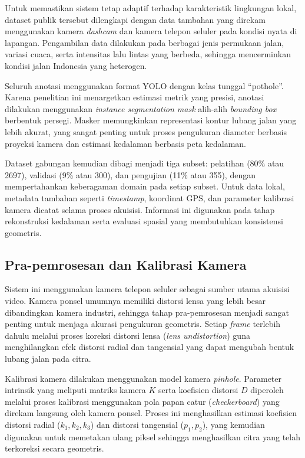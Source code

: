 Untuk memastikan sistem tetap adaptif terhadap karakteristik lingkungan lokal, dataset publik tersebut dilengkapi dengan data tambahan yang direkam menggunakan kamera \textit{dashcam} dan kamera telepon seluler pada kondisi nyata di lapangan. Pengambilan data dilakukan pada berbagai jenis permukaan jalan, variasi cuaca, serta intensitas lalu lintas yang berbeda, sehingga mencerminkan kondisi jalan Indonesia yang heterogen.

Seluruh anotasi menggunakan format YOLO dengan kelas tunggal “pothole”. Karena penelitian ini menargetkan estimasi metrik yang presisi, anotasi dilakukan menggunakan \textit{instance segmentation mask} alih-alih \textit{bounding box} berbentuk persegi. Masker memungkinkan representasi kontur lubang jalan yang lebih akurat, yang sangat penting untuk proses pengukuran diameter berbasis proyeksi kamera dan estimasi kedalaman berbasis peta kedalaman.

Dataset gabungan kemudian dibagi menjadi tiga subset: pelatihan (80\% atau 2697), validasi (9\% atau 300), dan pengujian (11\% atau 355), dengan mempertahankan keberagaman domain pada setiap subset. Untuk data lokal, metadata tambahan seperti \textit{timestamp}, koordinat GPS, dan parameter kalibrasi kamera dicatat selama proses akuisisi. Informasi ini digunakan pada tahap rekonstruksi kedalaman serta evaluasi spasial yang membutuhkan konsistensi geometris.

\subsection{Pra-pemrosesan dan Kalibrasi Kamera}
Sistem ini menggunakan kamera telepon seluler sebagai sumber utama akuisisi video. Kamera ponsel umumnya memiliki distorsi lensa yang lebih besar dibandingkan kamera industri, sehingga tahap pra-pemrosesan menjadi sangat penting untuk menjaga akurasi pengukuran geometris. Setiap \textit{frame} terlebih dahulu melalui proses koreksi distorsi lensa (\textit{lens undistortion}) guna menghilangkan efek distorsi radial dan tangensial yang dapat mengubah bentuk lubang jalan pada citra.

Kalibrasi kamera dilakukan menggunakan model kamera \textit{pinhole}. Parameter intrinsik yang meliputi matriks kamera $K$ serta koefisien distorsi $D$ diperoleh melalui proses kalibrasi menggunakan pola papan catur (\textit{checkerboard}) yang direkam langsung oleh kamera ponsel. Proses ini menghasilkan estimasi koefisien distorsi radial ($k_1, k_2, k_3$) dan distorsi tangensial ($p_1, p_2$), yang kemudian digunakan untuk memetakan ulang piksel sehingga menghasilkan citra yang telah terkoreksi secara geometris.

